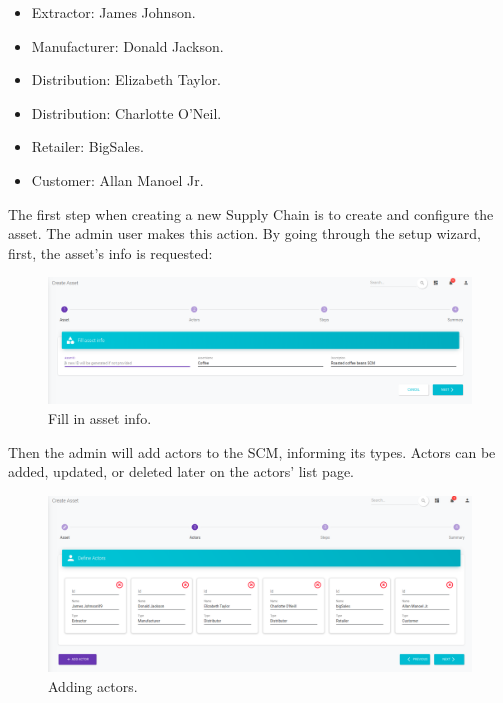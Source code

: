 \begin{itemize}
\item Extractor: James Johnson.
\item Manufacturer: Donald Jackson.
\item Distribution: Elizabeth Taylor.
\item Distribution: Charlotte O'Neil.
\item Retailer: BigSales.
\item Customer: Allan Manoel Jr.
\end{itemize}

The first step when creating a new Supply Chain  is to create and configure the asset. The admin user makes this action. By going through the setup wizard, first, the asset's info is requested:

\begin{figure}[H]
\begin{center}
  \includegraphics[scale=0.27]{images/use_example/01_create_asset_1.png}
\caption{Fill in asset info.}
\label{fig:create_asset_1}
\end{center}
\end{figure}

Then the admin will add actors to the SCM, informing its types. Actors can be added, updated, or deleted later on the actors' list page.

\begin{figure}[H]
\begin{center}
  \includegraphics[scale=0.27]{images/use_example/02_create_asset_2.png}
\caption{Adding actors.}
\label{fig:create_asset_2}
\end{center}
\end{figure}


